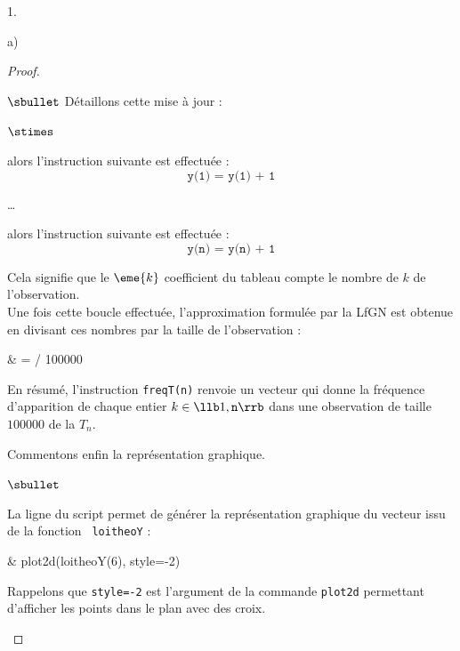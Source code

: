 \begin{noliste}{1.}
\begin{noliste}{a)}
\begin{proof}
\begin{noliste}{$\sbullet$}
        \noindent
        Détaillons cette mise à jour : 
        \begin{noliste}{$\stimes$}
        \item {} alors
          l'instruction suivante est effectuée :
          \[
          \texttt{y(1) = y(1) + 1}
          \]
        \item \ldots
        \item {} alors l'instruction
          suivante est effectuée :
          \[
          \texttt{y(n) = y(n) + 1}
          \]
        \end{noliste}
        Cela signifie que le $\eme{k}$ coefficient du tableau
        compte le nombre de $k$ de l'observation.\\
        Une fois cette boucle effectuée, l'approximation formulée par
        la LfGN est obtenue en divisant ces nombres par la taille de
        l'observation :
        \begin{scilabC}{6}
          & \quad {} =  / 100000 \nl %
        \end{scilabC}
      \item En résumé, l'instruction {\tt freqT(n)} renvoie un vecteur
        qui donne la fréquence d'apparition de chaque entier $k \in
        \llb 1, {\tt n} \rrb$ dans une observation de taille $100000$
        de la \var $T_n$. %
      \end{noliste}
      
      
      
      
      
      \noindent
      Commentons enfin la représentation graphique.
      \begin{noliste}{$\sbullet$}
      \item La ligne  du script permet de générer la
        représentation graphique du vecteur issu de la fonction {\tt
          loitheoY} :
        \begin{scilabC}{9}
          &  plot2d(loitheoY(6), style=-2) \nl %
        \end{scilabC}
        Rappelons que {\tt style=-2} est l'argument de la commande
        {\tt plot2d} permettant d'afficher les points dans le plan
        avec des croix.  %


\end{noliste}
\end{proof}
\end{noliste}
\end{noliste}
